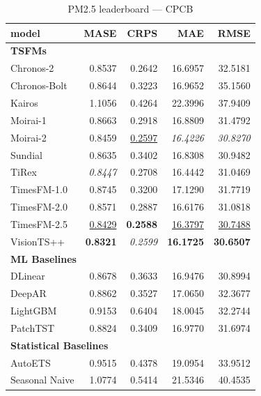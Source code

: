 \begin{table}[H]
\caption{PM2.5 leaderboard --- CPCB}
\centering
\begin{small}
\begin{tabular}{lrrrr}
\toprule
model & MASE & CRPS & MAE & RMSE \\
\midrule
\multicolumn{5}{l}{\textbf{TSFMs}} \\
Chronos-2 & 0.8537 & 0.2642 & 16.6957 & 32.5181 \\
Chronos-Bolt & 0.8644 & 0.3223 & 16.9652 & 35.1560 \\
Kairos & 1.1056 & 0.4264 & 22.3996 & 37.9409 \\
Moirai-1 & 0.8663 & 0.2918 & 16.8809 & 31.4792 \\
Moirai-2 & 0.8459 & \underline{0.2597} & \textit{16.4226} & \textit{30.8270} \\
Sundial & 0.8635 & 0.3402 & 16.8308 & 30.9482 \\
TiRex & \textit{0.8447} & 0.2708 & 16.4442 & 31.0469 \\
TimesFM-1.0 & 0.8745 & 0.3200 & 17.1290 & 31.7719 \\
TimesFM-2.0 & 0.8571 & 0.2887 & 16.6176 & 31.0818 \\
TimesFM-2.5 & \underline{0.8429} & \textbf{0.2588} & \underline{16.3797} & \underline{30.7488} \\
VisionTS++ & \textbf{0.8321} & \textit{0.2599} & \textbf{16.1725} & \textbf{30.6507} \\
\midrule
\multicolumn{5}{l}{\textbf{ML Baselines}} \\
DLinear & 0.8678 & 0.3633 & 16.9476 & 30.8994 \\
DeepAR & 0.8862 & 0.3527 & 17.0650 & 32.3677 \\
LightGBM & 0.9153 & 0.6404 & 18.0045 & 32.2744 \\
PatchTST & 0.8824 & 0.3409 & 16.9770 & 31.6974 \\
\midrule
\multicolumn{5}{l}{\textbf{Statistical Baselines}} \\
AutoETS & 0.9515 & 0.4378 & 19.0954 & 33.9512 \\
Seasonal Naive & 1.0774 & 0.5414 & 21.5346 & 40.4535 \\
\bottomrule
\end{tabular}
\end{small}
\end{table}